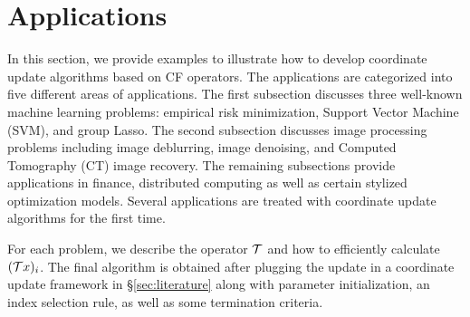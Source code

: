 \section{Applications}\label{sec:applications}
In this section, we provide examples to illustrate how to develop coordinate update algorithms based on CF operators. The applications are categorized into five different areas of applications. The first subsection discusses three well-known machine learning problems: empirical risk minimization, Support Vector Machine (SVM), and group Lasso. The second subsection  discusses image processing problems including image deblurring, image denoising, and  Computed Tomography (CT) image recovery. The remaining subsections provide applications in finance, distributed computing as well as certain stylized optimization models. Several applications are treated with coordinate update algorithms for the first time. 
\DIFaddbegin 

For each problem, we describe the operator ${\mathcal{T}}$ and how to efficiently calculate $({\mathcal{T}} x)_i$. The final algorithm is obtained after plugging the update in a coordinate update framework in \S\ref{sec:literature} along with  parameter initialization, an index selection rule, as well as some termination criteria.
